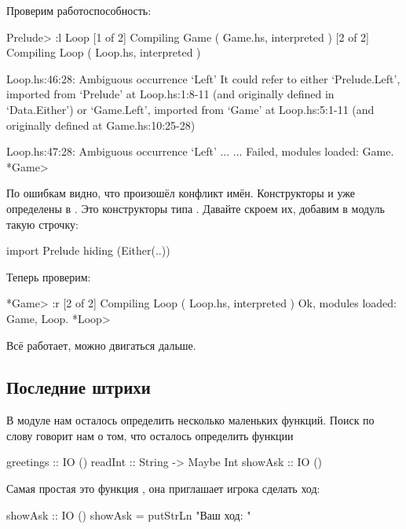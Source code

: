 Проверим работоспособность: 

\begin{code}
Prelude> :l Loop
[1 of 2] Compiling Game             ( Game.hs, interpreted )
[2 of 2] Compiling Loop             ( Loop.hs, interpreted )

Loop.hs:46:28:
    Ambiguous occurrence `Left'
    It could refer to either `Prelude.Left',
                             imported from `Prelude' at Loop.hs:1:8-11
                             (and originally defined in `Data.Either')
                          or `Game.Left',
                             imported from `Game' at Loop.hs:5:1-11
                             (and originally defined at Game.hs:10:25-28)

Loop.hs:47:28:
    Ambiguous occurrence `Left'
...
...
Failed, modules loaded: Game.
*Game> 
\end{code}

По ошибкам видно, что произошёл конфликт имён. Конструкторы
 и  уже определены в . Это конструкторы
типа . Давайте скроем их, добавим в модуль такую строчку:

\begin{code}
import Prelude hiding (Either(..))
\end{code}

Теперь проверим:

\begin{code}
*Game> :r
[2 of 2] Compiling Loop             ( Loop.hs, interpreted )
Ok, modules loaded: Game, Loop.
*Loop> 
\end{code}

Всё работает, можно двигаться дальше.

\subsection{Последние штрихи}

В модуле  нам осталось определить несколько маленьких
функций. Поиск по слову  говорит нам о том, что
осталось определить функции \In{}


\begin{code}
greetings   :: IO ()
readInt     :: String -> Maybe Int
showAsk     :: IO ()
\end{code}

Самая простая это функция , она
приглашает игрока сделать ход:

\begin{code}
showAsk :: IO ()
showAsk = putStrLn "Ваш ход: "
\end{code}

